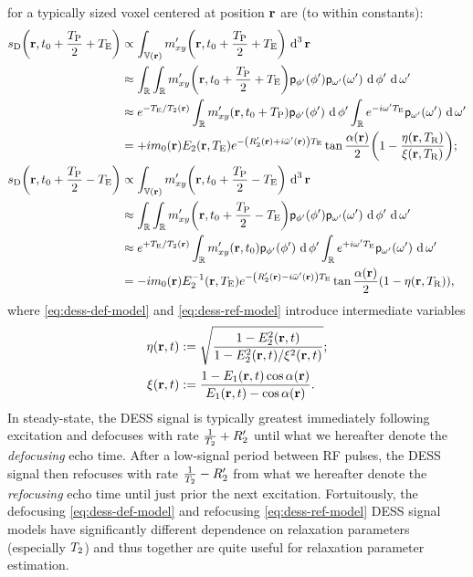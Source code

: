 for a typically sized voxel centered at position $\mathbf{r}$ are
(to within constants):
\begin{align}
	\dess\paren{\bmr,t_0+\frac{\TP}{2}+\TE} 
		&\propto \int_{\setV\paren{\bmr}} 
			\mxyp\paren{\bmr,t_0+\frac{\TP}{2}+\TE} \dercubed{\bmr}
			\label{eq:dess-def-int} \\
		&\approx \int_\real \int_\real \mxyp\paren{\bmr,t_0+\frac{\TP}{2}+\TE} 
			\dist{\php}\paren{\php} \dist{\omp}\paren{\omp} \der{\php} \der{\omp}
			\nonumber \\
		&\approx e^{-\TE/\Tt\pr}
			\int_\real \mxyp\paren{\bmr,t_0+\TP} \dist{\php}\paren{\php} \der{\php} 
			\int_\real e^{-i\omp\TE} \dist{\omp}\paren{\omp} \der{\omp}
			\nonumber \\
		&= +i\mzero\pr \Et\paren{\bmr,\TE} e^{-\paren{\Rtp\pr+i\ompmed\pr}\TE}
			\tan\frac{\alpha\pr}{2} 
			\paren{1 - \frac{\eta\paren{\bmr,\TR}}{\xi\paren{\bmr,\TR}}};
			\label{eq:dess-def-model} \\
	\dess\paren{\bmr,t_0+\frac{\TP}{2}-\TE}
		&\propto \int_{\setV\paren{\bmr}}
			\mxyp\paren{\bmr,t_0+\frac{\TP}{2}-\TE} \dercubed{\bmr}
			\label{eq:dess-ref-int} \\
		&\approx \int_\real \int_\real \mxyp\paren{\bmr,t_0+\frac{\TP}{2}-\TE} 
			\dist{\php}\paren{\php} \dist{\omp}\paren{\omp} \der{\php} \der{\omp}
			\nonumber \\
		&\approx e^{+\TE/\Tt\pr}
			\int_\real \mxyp\paren{\bmr,t_0} \dist{\php}\paren{\php} \der{\php} 
			\int_\real e^{+i\omp\TE} \dist{\omp}\paren{\omp} \der{\omp} 
			\nonumber \\
		&= -i\mzero\pr \Et^{-1}\paren{\bmr,\TE} e^{-\paren{\Rtp\pr-i\ompmed\pr}\TE}
			\tan\frac{\alpha\pr}{2}
			\paren{1 - \eta\paren{\bmr,\TR}},
			\label{eq:dess-ref-model}
\end{align}	
where \eqref{eq:dess-def-model} and \eqref{eq:dess-ref-model}
introduce intermediate variables
\begin{align}
	\eta\prt &:=
		\sqrt{\frac{1-\Et^2\prt}{1-\Et^2\prt/\xi^2\prt}};
		\nonumber \\
	\xi\prt &:=
		\frac{1-\Eo\prt \cos{\flip\pr}}{\Eo\prt - \cos{\flip\pr}}.
		\nonumber
\end{align}
In steady-state, 
the DESS signal is typically greatest 
immediately following excitation 
and defocuses with rate $\frac{1}{T_2}+R_2'$
until what we hereafter denote
the \emph{defocusing} echo time.
After a low-signal period between RF pulses,
the DESS signal then refocuses
with rate $\frac{1}{T_2}-R_2'$
from what we hereafter denote
the \emph{refocusing} echo time
until just prior the next excitation.
Fortuitously,
the defocusing \eqref{eq:dess-def-model}
and refocusing \eqref{eq:dess-ref-model}
DESS signal models
have significantly different dependence 
on relaxation parameters (especially $T_2$)
and thus together are quite useful
for relaxation parameter estimation.

